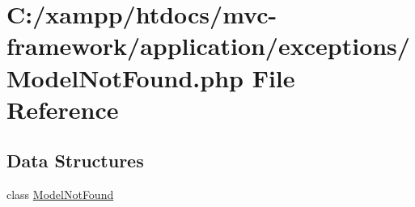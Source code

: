 \hypertarget{_model_not_found_8php}{}\section{C\+:/xampp/htdocs/mvc-\/framework/application/exceptions/\+Model\+Not\+Found.php File Reference}
\label{_model_not_found_8php}
\subsection*{Data Structures}
\begin{DoxyCompactItemize}
\item 
class \hyperlink{class_model_not_found}{Model\+Not\+Found}
\end{DoxyCompactItemize}
